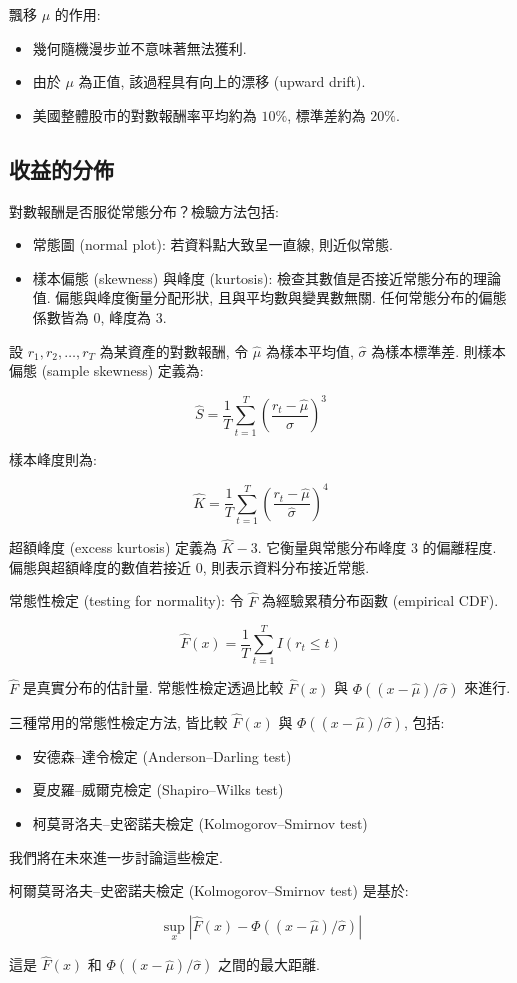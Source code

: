 \documentclass[letterpaper]{article}
\begin{document}
		
		飄移 $\mu$ 的作用: 
		
		\begin{itemize}
			\item 幾何隨機漫步並不意味著無法獲利. 
			\item 由於 \(\mu\) 為正值, 該過程具有向上的漂移 (upward drift). 
			\item 美國整體股市的對數報酬率平均約為 \(10\%\), 標準差約為 \(20\%\). 
		\end{itemize}
		
		\subsection{收益的分佈}
		對數報酬是否服從常態分布？檢驗方法包括: 
		
		\begin{itemize}
			\item 常態圖 (normal plot): 若資料點大致呈一直線, 則近似常態. 
			\item 樣本偏態 (skewness) 與峰度 (kurtosis): 檢查其數值是否接近常態分布的理論值. 偏態與峰度衡量分配形狀, 且與平均數與變異數無關. 任何常態分布的偏態係數皆為 0, 峰度為 3. 
		\end{itemize}
		
		設 \( r_{1}, r_{2}, \ldots, r_{T} \) 為某資產的對數報酬, 令 \(\hat{\mu}\) 為樣本平均值, \(\hat{\sigma}\) 為樣本標準差. 則樣本偏態 (sample skewness) 定義為: 
		
		$$
		\hat{S}=\frac{1}{T} \sum_{t=1}^{T}\left (\frac{r_{t}-\hat{\mu}}{\hat{\sigma}}\right) ^{3}
		$$
		
		樣本峰度則為: 
		
		$$
		\hat{K}=\frac{1}{T} \sum_{t=1}^{T}\left (\frac{r_{t}-\hat{\mu}}{\hat{\sigma}}\right) ^{4}
		$$
		
		超額峰度 (excess kurtosis) 定義為 \(\hat{K} - 3\). 它衡量與常態分布峰度 3 的偏離程度. 偏態與超額峰度的數值若接近 0, 則表示資料分布接近常態. 
		
		
		常態性檢定 (testing for normality):  令 \(\hat{F}\) 為經驗累積分布函數 (empirical CDF). 
		
		$$
		\hat{F} (x) =\frac{1}{T} \sum_{t=1}^{T} I\left (r_{t} \leq t\right) 
		$$
		
		\(\hat{F}\) 是真實分布的估計量. 
		常態性檢定透過比較 \(\hat{F} (x) \) 與 \(\Phi ( (x - \hat{\mu}) / \hat{\sigma}) \) 來進行. 
		
		三種常用的常態性檢定方法, 皆比較 \(\hat{F} (x) \) 與 \(\Phi ( (x - \hat{\mu}) / \hat{\sigma}) \), 包括: 
		
		\begin{itemize}
			\item 安德森–達令檢定 (Anderson–Darling test) 
			\item 夏皮羅–威爾克檢定 (Shapiro–Wilks test) 
			\item 柯莫哥洛夫–史密諾夫檢定 (Kolmogorov–Smirnov test) 
		\end{itemize}
		
		我們將在未來進一步討論這些檢定. 
		
		柯爾莫哥洛夫–史密諾夫檢定 (Kolmogorov–Smirnov test) 是基於: 
		
		
		$$
		\sup _{x}|\hat{F} (x) -\Phi ( (x-\hat{\mu}) / \hat{\sigma}) |
		$$
		
		這是 $\hat{F} (x) $ 和 $\Phi ( (x-\hat{\mu}) / \hat{\sigma}) $ 之間的最大距離. 
		
		
	
\end{document}
